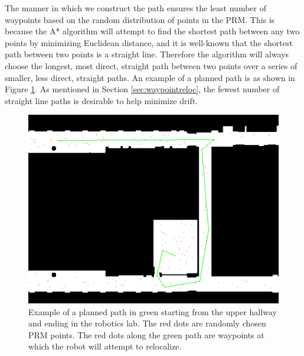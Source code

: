 \documentclass[12pt]{article}
\begin{document}
The manner in which we construct the path ensures the least number of waypoints based on the random distribution of points in the PRM. This is because the A* algorithm will attempt to find the shortest path between any two points by minimizing Euclidean distance, and it is well-known that the shortest path between two points is a straight line. Therefore the algorithm will always choose the longest, most direct, straight path between two points over a series of smaller, less direct, straight paths. An example of a planned path is as shown in Figure \ref{fig:expath}. As mentioned in Section \ref{sec:waypointreloc}, the fewest number of straight line paths is desirable to help minimize drift.

\begin{figure}[H]
\centering
\includegraphics[scale=.4]{img/expath.jpg}
\caption{Example of a planned path in green starting from the upper hallway and ending in the robotics lab. The red dots are randomly chosen PRM points. The red dots along the green path are waypoints at which the robot will attempt to relocalize.}
\label{fig:expath}
\end{figure}
\end{document}
